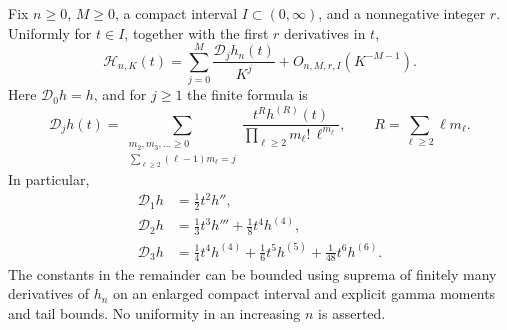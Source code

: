 \begin{theorem}\label{zero:all-orders}
Fix $n\geq0$, $M\geq0$, a compact interval $I\subset(0,\infty)$,
and a nonnegative integer $r$.  Uniformly for $t\in I$, together with
the first $r$ derivatives in $t$,
\begin{equation}\label{zero:expansion}
 \mathcal H_{n,K}(t)=\sum_{j=0}^{M}\frac{\mathcal D_jh_n(t)}{K^j}
                         +O_{n,M,r,I}(K^{-M-1}).
\end{equation}
Here $\mathcal D_0h=h$, and for $j\geq1$ the finite formula is
\begin{equation}\label{zero:D-general}
 \mathcal D_jh(t)=
 \sum_{\substack{m_2,m_3,\ldots\geq0\\
                 \sum_{\ell\geq2}(\ell-1)m_\ell=j}}
 \frac{t^R h^{(R)}(t)}{
             \prod_{\ell\geq2}m_\ell!\,\ell^{m_\ell}},
 \qquad R=\sum_{\ell\geq2}\ell m_\ell.
\end{equation}
In particular,
\begin{align}
 \mathcal D_1h&=\tfrac12t^2h'',\label{zero:D1}\\
 \mathcal D_2h&=\tfrac13t^3h'''+\tfrac18t^4h^{(4)},\label{zero:D2}\\
 \mathcal D_3h&=\tfrac14t^4h^{(4)}+\tfrac16t^5h^{(5)}
                                      +\tfrac1{48}t^6h^{(6)}.
\end{align}
The constants in the remainder can be bounded using suprema of finitely
many derivatives of $h_n$ on an enlarged compact interval and explicit
gamma moments and tail bounds.  No uniformity in an increasing $n$
is asserted.
\end{theorem}
